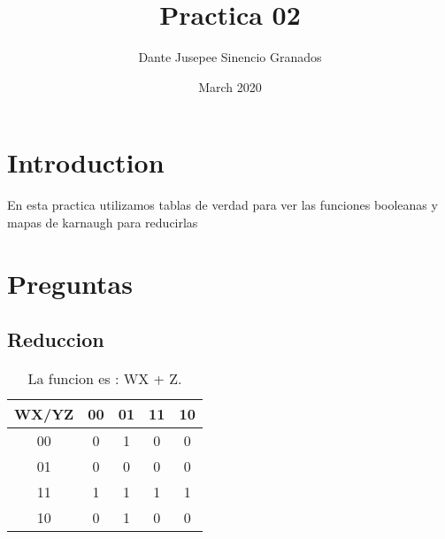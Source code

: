 \documentclass{article}
\title{Practica 02}
\author{Dante Jusepee Sinencio Granados}
\affil{Facultad de ciencias, UNAM}
\date{March 2020}
\begin{document}
\maketitle

\section{Introduction}

En esta practica utilizamos tablas de verdad para ver las funciones booleanas y mapas de karnaugh para reducirlas

\section{Preguntas}

\subsection{Reduccion}
\begin{table}[H]
  \centering
    \begin{tabular}{| c | c | c | c | c |}
      \hline \cellcolor{gray!25}WX/YZ & \cellcolor{gray!25}00 & \cellcolor{gray!25}01 & \cellcolor{gray!25}11 & \cellcolor{gray!25}10 \\ \hline
      \cellcolor{gray!25}00 & 0 & \cellcolor{blue!25}1 & 0 & 0\\ \hline
      \cellcolor{gray!25}01 & 0 & 0 & 0 & 0\\ \hline
      \cellcolor{gray!25}11 & \cellcolor{blue!25}1 & \cellcolor{blue!25}1 & \cellcolor{blue!25}1 & \cellcolor{blue!25}1\\ \hline
      \cellcolor{gray!25}10 & 0 & \cellcolor{blue!25}1 & 0 & 0\\ \hline
    \end{tabular}
  \caption{La funcion es : WX + Z.}
\end{table}
\end{document}
